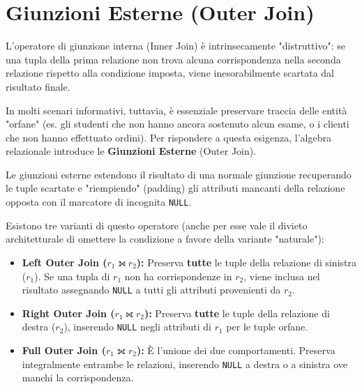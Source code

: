 \section{Giunzioni Esterne (Outer Join)}

L'operatore di giunzione interna (Inner Join) è intrinsecamente "distruttivo": se una tupla della prima relazione non trova alcuna corrispondenza nella seconda relazione rispetto alla condizione imposta, viene inesorabilmente scartata dal risultato finale.

In molti scenari informativi, tuttavia, è essenziale preservare traccia delle entità "orfane" (es. gli studenti che non hanno ancora sostenuto alcun esame, o i clienti che non hanno effettuato ordini). Per rispondere a questa esigenza, l'algebra relazionale introduce le \textbf{Giunzioni Esterne} (Outer Join).

Le giunzioni esterne estendono il risultato di una normale giunzione recuperando le tuple scartate e "riempiendo" (padding) gli attributi mancanti della relazione opposta con il marcatore di incognita \texttt{NULL}.

Esistono tre varianti di questo operatore (anche per esse vale il divieto architetturale di omettere la condizione a favore della variante "naturale"):
\begin{itemize}
    \item \textbf{Left Outer Join ($r_1 \leftouterjoin r_2$):} Preserva \textbf{tutte} le tuple della relazione di sinistra ($r_1$). Se una tupla di $r_1$ non ha corrispondenze in $r_2$, viene inclusa nel risultato assegnando \texttt{NULL} a tutti gli attributi provenienti da $r_2$.
    \item \textbf{Right Outer Join ($r_1 \rightouterjoin r_2$):} Preserva \textbf{tutte} le tuple della relazione di destra ($r_2$), inserendo \texttt{NULL} negli attributi di $r_1$ per le tuple orfane.
    \item \textbf{Full Outer Join ($r_1 \fullouterjoin r_2$):} È l'unione dei due comportamenti. Preserva integralmente entrambe le relazioni, inserendo \texttt{NULL} a destra o a sinistra ove manchi la corrispondenza.
\end{itemize}


